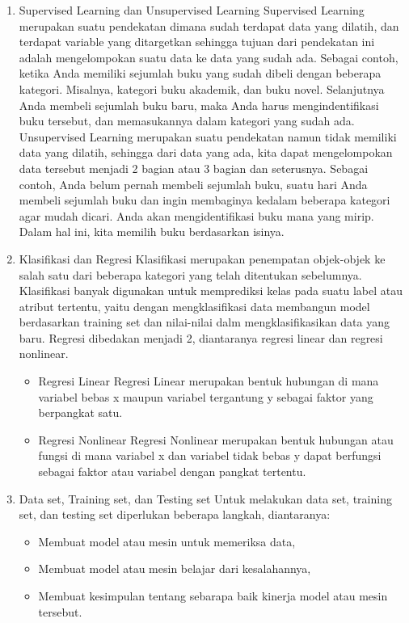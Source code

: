 \begin{enumerate}
\item
Supervised Learning dan Unsupervised Learning
\subitem
Supervised Learning merupakan suatu pendekatan dimana sudah terdapat data yang dilatih, dan terdapat variable yang ditargetkan sehingga tujuan dari pendekatan ini adalah mengelompokan suatu data ke data yang sudah ada. Sebagai contoh, ketika Anda memiliki sejumlah buku yang sudah dibeli dengan beberapa kategori. Misalnya, kategori buku akademik, dan buku novel. Selanjutnya Anda membeli sejumlah buku baru, maka Anda harus mengindentifikasi buku tersebut, dan memasukannya dalam kategori yang sudah ada.
\subitem
Unsupervised Learning merupakan suatu pendekatan namun tidak memiliki data yang dilatih, sehingga dari data yang ada, kita dapat mengelompokan data tersebut menjadi 2 bagian atau 3 bagian dan seterusnya. Sebagai contoh, Anda belum pernah membeli sejumlah buku, suatu hari Anda membeli sejumlah buku dan ingin membaginya kedalam beberapa kategori agar mudah dicari. Anda akan mengidentifikasi buku mana yang mirip. Dalam hal ini, kita memilih buku berdasarkan isinya.


\item
Klasifikasi dan Regresi
\subitem
Klasifikasi merupakan penempatan objek-objek ke salah satu dari beberapa kategori yang telah ditentukan sebelumnya. Klasifikasi banyak digunakan untuk memprediksi kelas pada suatu label atau atribut tertentu, yaitu dengan mengklasifikasi data membangun model berdasarkan training set dan nilai-nilai dalm mengklasifikasikan data yang baru.
Regresi dibedakan menjadi 2, diantaranya regresi linear dan regresi nonlinear.
\begin{itemize}
\item
Regresi Linear
Regresi Linear merupakan bentuk hubungan di mana variabel bebas x maupun variabel tergantung y sebagai faktor yang berpangkat satu.
\item
Regresi Nonlinear
Regresi Nonlinear merupakan bentuk hubungan atau fungsi di mana variabel x dan variabel tidak bebas y dapat berfungsi sebagai faktor atau variabel dengan pangkat tertentu.
\end{itemize}

\item
Data set, Training set, dan Testing set
\subitem
Untuk melakukan data set, training set, dan testing set diperlukan beberapa langkah, diantaranya:
\begin{itemize}
\item
Membuat model atau mesin untuk memeriksa data,
\item
Membuat model atau mesin belajar dari kesalahannya,
\item
Membuat kesimpulan tentang sebarapa baik kinerja model atau mesin tersebut.
\end{itemize}


\end{enumerate}
